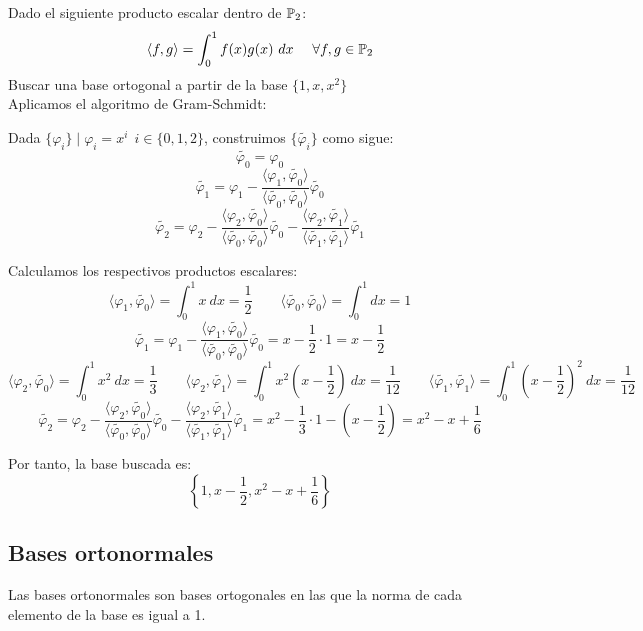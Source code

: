 \begin{ejemplo}
 Dado el siguiente producto escalar dentro de $\mathbb{P}_2$:
$$\langle f,g \rangle = \int_0^1 f(x)g(x)~dx~~~~\forall f,g \in \mathbb{P}_2$$
Buscar una base ortogonal a partir de la base $\{1,x,x^2\}$\\

\noindent
Aplicamos el algoritmo de Gram-Schmidt:\par
Dada $\{\varphi_i\} \mid \varphi_i = x^i~~i \in \{0,1,2\}$, construimos $\{\tilde{\varphi_i}\}$ como sigue:
$$\tilde{\varphi_0} = \varphi_0$$
$$\tilde{\varphi_1} = \varphi_1 - \dfrac{\langle \varphi_1, \tilde{\varphi_0} \rangle}{\langle \tilde{\varphi_0},
        \tilde{\varphi_0} \rangle} \tilde{\varphi_0}$$
$$\tilde{\varphi_2} = \varphi_2 - \dfrac{\langle \varphi_2, \tilde{\varphi_0} \rangle}{\langle \tilde{\varphi_0},
        \tilde{\varphi_0} \rangle} \tilde{\varphi_0} - \dfrac{\langle \varphi_2, \tilde{\varphi_1} \rangle}{\langle \tilde{\varphi_1},
        \tilde{\varphi_1} \rangle} \tilde{\varphi_1}$$

Calculamos los respectivos productos escalares:
$$\langle \varphi_1, \tilde{\varphi_0} \rangle = \int_0^1 x~dx = \dfrac{1}{2}
\qquad 
\langle \tilde{\varphi_0}, \tilde{\varphi_0} \rangle = \int_0^1 dx = 1$$
$$\tilde{\varphi_1} = \varphi_1 - \dfrac{\langle \varphi_1, \tilde{\varphi_0} \rangle}{\langle \tilde{\varphi_0},
        \tilde{\varphi_0} \rangle} \tilde{\varphi_0} = x - \dfrac{1}{2} \cdot 1 = x - \dfrac{1}{2}$$
\begin{equation*}
    \langle \varphi_2, \tilde{\varphi_0} \rangle = \int_0^1 x^2~dx = \dfrac{1}{3}
\qquad
\langle \varphi_2, \tilde{\varphi_1} \rangle = \int_0^1 x^2(x - \dfrac{1}{2})~dx = \dfrac{1}{12}
\qquad
\langle \tilde{\varphi_1}, \tilde{\varphi_1} \rangle = \int_0^1 (x-\dfrac{1}{2})^2~dx = \dfrac{1}{12}
\end{equation*}
$$\tilde{\varphi_2} = \varphi_2 - \dfrac{\langle \varphi_2, \tilde{\varphi_0} \rangle}{\langle \tilde{\varphi_0},
        \tilde{\varphi_0} \rangle} \tilde{\varphi_0} - \dfrac{\langle \varphi_2, \tilde{\varphi_1} \rangle}{\langle \tilde{\varphi_1},
        \tilde{\varphi_1} \rangle} \tilde{\varphi_1} = x^2 - \dfrac{1}{3} \cdot 1 - \left(x- \dfrac{1}{2}\right) = x^2 - x + \dfrac{1}{6}$$

\noindent
Por tanto, la base buscada es:
$$\left\{1, x-\dfrac{1}{2}, x^2-x+\dfrac{1}{6}\right\}$$
\end{ejemplo}

\subsection{Bases ortonormales}
\noindent Las bases ortonormales son bases ortogonales en las que la norma de cada elemento de la base es igual a 1.\\

